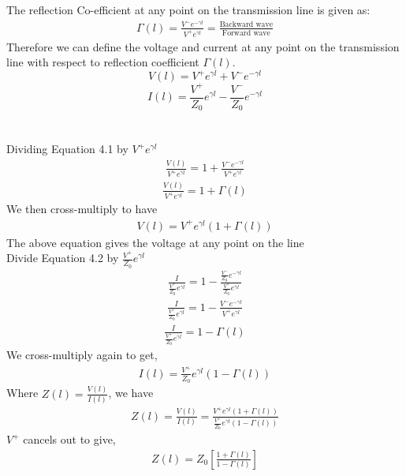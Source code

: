 The reflection Co-efficient at any point on the transmission line is given as:
\begin{align*}
\Gamma{(l)} = \frac{V^-e^{-\gamma l}}{V^+e^{\gamma l}} = \frac{\text{Backward wave}}{\text{Forward wave}}
\end{align*}
Therefore we can define the voltage and current at any point on the transmission line with respect to reflection coefficient $\Gamma(l)$.
\begin{equation}
V(l) = V^+e^{\gamma l} + V^-e^{-\gamma l}
\end{equation}
\begin{equation}
I(l) =\frac{V^+}{Z_0} e^{\gamma l} - \frac{V^-}{Z_0}e^{-\gamma l}
\end{equation}\\\\
Dividing Equation 4.1 by $V^+e^{\gamma l}$
\begin{align*}
\frac{V(l)}{ V^+e^{\gamma l}} = 1 + \frac{ V^-e^{-\gamma l}}{ V^+e^{\gamma l}}
\end{align*}
\begin{align*}
\frac{V(l)}{ V^+e^{\gamma l}} = 1 + \Gamma(l)
\end{align*}
We then cross-multiply to have
\begin{align*}
V(l) = V^+e^{\gamma l} (1 + \Gamma(l))
\end{align*}
The above equation gives the voltage at any point on the line\\
Divide Equation 4.2 by $\frac{V^+}{Z_0} e^{\gamma l}$
\begin{align*}
\frac{I}{\frac{V^+}{Z_0} e^{\gamma l}} = 1 - \frac{\frac{V^-}{Z_0} e^{-\gamma l}}{\frac{V^+}{Z_0} e^{\gamma l}}
\end{align*}
\begin{align*}
\frac{I}{\frac{V^+}{Z_0} e^{\gamma l}}= 1 - \frac{V^-e^{-\gamma l}}{V^+e^{\gamma l}}
\end{align*}
\begin{align*}
\frac{I}{\frac{V^+}{Z_0} e^{\gamma l}} = 1 - \Gamma(l)
\end{align*}
We cross-multiply again to get,
\begin{align*}
I(l) = \frac{V^+}{Z_0} e^{\gamma l} (1 - \Gamma(l))
\end{align*}
Where $Z(l) = \frac{V(l)}{I(l)}$, we have
\begin{align*}
Z(l) = \frac{V(l)}{I(l)} = \frac{V^+e^{\gamma l} (1 + \Gamma(l))}{ \frac{V^+}{Z_0} e^{\gamma l} (1 - \Gamma(l))}
\end{align*}
$V^+$ cancels out to give,
\begin{align}
Z(l) = Z_0[\frac{1 + \Gamma(l)}{1 - \Gamma(l)}]
\end{align}

